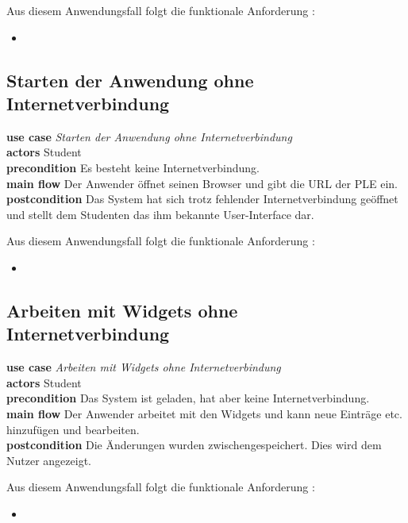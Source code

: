 Aus diesem Anwendungsfall folgt die funktionale Anforderung :
\begin{itemize}
 \item \requirement{\requirementCheckOnlineStatus}\label{requirementCheckOnlineStatus}
\end{itemize}

\subsection{Starten der Anwendung ohne Internetverbindung}
\textbf{use case} \emph{Starten der Anwendung ohne Internetverbindung}\\
\textbf{actors} Student\\
\textbf{precondition} Es besteht keine Internetverbindung.\\
\textbf{main flow} Der Anwender öffnet seinen Browser und gibt die URL der PLE ein.\\
\textbf{postcondition} Das System hat sich trotz fehlender Internetverbindung geöffnet und stellt dem Studenten das ihm bekannte User-Interface dar.
 
Aus diesem Anwendungsfall folgt die funktionale Anforderung :
\begin{itemize}
 \item \requirement{\requirementOfflineStart}\label{requirementOfflineStart}
\end{itemize}

\subsection{Arbeiten mit Widgets ohne Internetverbindung}
\textbf{use case} \emph{Arbeiten mit Widgets ohne Internetverbindung}\\
\textbf{actors} Student\\
\textbf{precondition} Das System ist geladen, hat aber keine Internetverbindung.\\
\textbf{main flow} Der Anwender arbeitet mit den Widgets und kann neue Einträge etc. hinzufügen und bearbeiten.\\
\textbf{postcondition} Die Änderungen wurden zwischengespeichert. Dies wird dem Nutzer angezeigt.

Aus diesem Anwendungsfall folgt die funktionale Anforderung :
\begin{itemize}
 \item \requirement{\requirementOfflineWork}\label{requirementOfflineWork}
\end{itemize}

